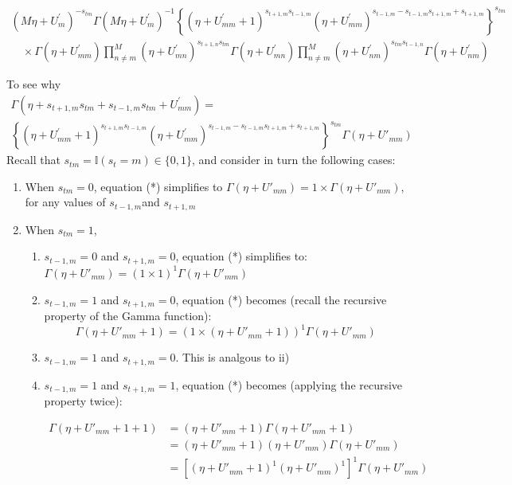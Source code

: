 \documentclass{article}
\begin{document}
$$
\begin{array}{l}\left(M \eta+U_{m}^{\prime}\right)^{-s_{t m}} \Gamma\left(M \eta+U_{m}^{\prime}\right)^{-1}\left\{\left(\eta+U_{m m}^{\prime}+1\right)^{s_{t+1, m} s_{t-1, m}}\left(\eta+U_{m m}^{\prime}\right)^{s_{t-1, m}-s_{t-1, m} s_{t+1, m}+s_{t+1, m}}\right\}^{s_{t m}} \\ \quad \times \Gamma\left(\eta+U_{m m}^{\prime}\right) \prod_{n \neq m}^{M}\left(\eta+U_{m n}^{\prime}\right)^{s_{t+1, n} s_{t m}} \Gamma\left(\eta+U_{m n}^{\prime}\right) \prod_{n \neq m}^{M}\left(\eta+U_{n m}^{\prime}\right)^{s_{t m} s_{t-1, n}} \Gamma\left(\eta+U_{n m}^{\prime}\right)\end{array}
$$

\color{red} 
\noindent To see why 
\begin{multline*}
  \Gamma\left(\eta+s_{t+1, m} s_{t m}+s_{t-1, m} s_{t m}+U_{m m}^{\prime}\right) = \\ \left\{\left(\eta+U_{m m}^{\prime}+1\right)^{s_{t+1, m} s_{t-1, m}}\left(\eta+U_{m m}^{\prime}\right)^{s_{t-1, m}-s_{t-1, m} s_{t+1, m}+s_{t+1, m}}\right\}^{s_{t m}} \Gamma(\eta + U'_{mm}) \tag{*}
\end{multline*}
Recall that $s_{tm} = \mathbb{I}(s_t = m) \in \{0,1\}$, and consider in turn the following cases:

\begin{enumerate}
    \item[1)] When $s_{tm} = 0$, equation (*) simplifies to $\Gamma(\eta + U'_{mm}) = 1 \times \Gamma(\eta + U'_{mm})$, for any values of $s_{t-1,m} $and $s_{t+1,m}$
    \item[2)] When $s_{tm} = 1$,
    \begin{enumerate}
        \item[i)] $s_{t-1,m} = 0$ and $s_{t+1, m} = 0$, equation (*) simplifies to: $\Gamma(\eta + U'_{mm}) = (1 \times 1)^1 \Gamma(\eta + U'_{mm})$
        \item[ii)] $s_{t-1, m} = 1$ and $s_{t+1, m} = 0$, equation (*) becomes (recall the recursive property of the Gamma function):
        $$\Gamma(\eta +  U'_{mm} + 1) = \left(1 \times (\eta +  U'_{mm} + 1) \right)^1\Gamma(\eta + U'_{mm})$$
        \item[iii)] $s_{t-1, m} = 1$ and $s_{t+1, m} = 0$. This is analgous to ii)
        \item[iv)] $s_{t-1, m} = 1$ and $s_{t+1, m} = 1$, equation (*) becomes (applying the recursive property twice):

        \begin{align*}
           \Gamma(\eta + U'_{mm} + 1 + 1) &= (\eta +  U'_{mm} + 1)\Gamma(\eta + U'_{mm} + 1)\\ 
           &= (\eta +  U'_{mm} + 1)(\eta +  U'_{mm} )\Gamma(\eta + U'_{mm}) \\
           &= \left[(\eta +  U'_{mm} + 1)^1(\eta +  U'_{mm} )^1\right]^1\Gamma(\eta + U'_{mm})
        \end{align*}
    \end{enumerate}
\end{enumerate}
\color{black}
\end{document}
